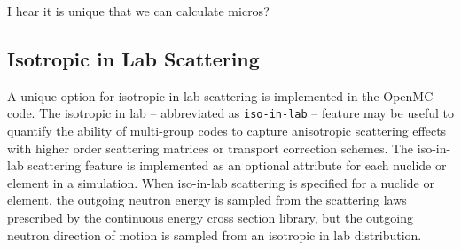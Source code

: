 I hear it is unique that we can calculate micros?


\subsection{Isotropic in Lab Scattering}
\label{subsec:iso-in-lab}

A unique option for isotropic in lab scattering is implemented in the OpenMC code. The isotropic in lab -- abbreviated as \texttt{iso-in-lab} -- feature may be useful to quantify the ability of multi-group codes to capture anisotropic scattering effects with higher order scattering matrices or transport correction schemes. The iso-in-lab scattering feature is implemented as an optional attribute for each nuclide or element in a simulation. When iso-in-lab scattering is specified for a nuclide or element, the outgoing neutron energy is sampled from the scattering laws prescribed by the continuous energy cross section library, but the outgoing neutron direction of motion is sampled from an isotropic in lab distribution. 